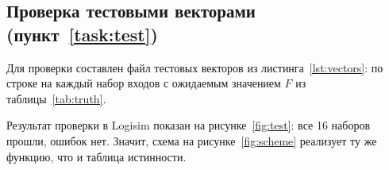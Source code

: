 \subsection{Проверка тестовыми векторами (пункт~\ref{task:test})}
Для проверки составлен файл тестовых векторов из листинга~\ref{lst:vectors}: по строке на
каждый набор входов с ожидаемым значением $F$ из таблицы~\ref{tab:truth}.


Результат проверки в Logisim показан на рисунке~\ref{fig:test}: все 16 наборов прошли, ошибок
нет. Значит, схема на рисунке~\ref{fig:scheme} реализует ту же функцию, что и таблица
истинности.

